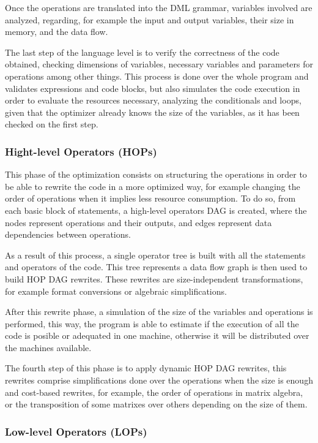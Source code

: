 \documentclass[11pt]{book} %
\begin{document}
        Once the operations are translated into the DML grammar, variables involved are analyzed, regarding, for example the input and output variables, their size in memory, and the data flow.

        The last step of the language level is to verify the correctness of the code obtained, checking dimensions of variables, necessary variables and parameters for operations among other things. This process is done over the whole program and validates expressions and code blocks, but also simulates the code execution in order to evaluate the resources necessary, analyzing the conditionals and loops, given that the optimizer already knows the size of the variables, as it has been checked on the first step.

      \subsubsection{Hight-level Operators (HOPs)}

        This phase of the optimization consists on structuring the operations in order to be able to rewrite the code in a more optimized way, for example changing the order of operations when it implies less resource consumption. To do so, from each basic block of statements, a high-level operators DAG is created, where the nodes represent operations and their outputs, and edges represent data dependencies between operations.

        As a result of this process, a single operator tree is built with all the statements and operators of the code. This tree represents a data flow graph is then used to build HOP DAG rewrites. These rewrites are size-independent transformations, for example format conversions or algebraic simplifications.

        After this rewrite phase, a simulation of the size of the variables and operations is performed, this way, the program is able to estimate if the execution of all the code is posible or adequated in one machine, otherwise it will be distributed over the machines available.

        The fourth step of this phase is to apply dynamic HOP DAG rewrites, this rewrites comprise simplifications done over the operations when the size is enough and cost-based rewrites, for example, the order of operations in matrix algebra, or the transposition of some matrixes over others depending on the size of them.

      \subsubsection{Low-level Operators (LOPs)}
\end{document}
